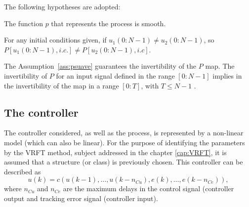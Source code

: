 The following hypotheses are adopted:
\begin{assum}\label{ass:psuave}
   The function $p$ that represents the process is smooth.
\end{assum}
\begin{assum}\label{ass:invert}
   For any initial conditions given, if
   $u_{1}(0{:}N-1) \neq u_{2}(0{:} N-1)$, so $P\left[u_{1}(0{:} N-1), i . c .\right] \neq P\left[u_{2}(0{:} N-1), i . c\right]$.
\end{assum}

The Assumption~\ref{ass:psuave} guarantees the invertibility of the $P$ map. The invertibility of $P$ for an input signal defined in the range $\left[ 0{:}N-1 \right]$
implies in the invertibility of the map in a range $[0{:}T]$, with $T\le N-1$ \citep{campi2004}.


\subsection{The controller}%
\label{sub:o_controlador}

The controller considered, as well as the process, is represented by a non-linear model (which can also be linear). For the purpose of identifying the parameters by the VRFT method, subject addressed in the chapter \ref{cap:VRFT}, it is assumed that a structure (or class) is previously chosen. This controller can be described as
\begin{equation}
   u(k)=c\left(u(k-1), \ldots, u(k-n_{C u}), e(k), \ldots, e(k-n_{C e})\right),
\label{eq:uknl}
\end{equation}
where $n_{Cu}$ and $n_{Ce}$ are the maximum delays in the control signal (controller output and tracking error signal (controller input).

